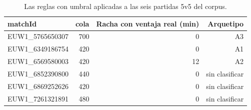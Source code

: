 \begin{table}[H]
\centering
\small
\caption{Las reglas con umbral aplicadas a las seis partidas 5v5 del corpus.}
\label{tab:arquetipos}
\begin{tabular}{lrrr}
\toprule
matchId & cola & Racha con ventaja real (min) & Arquetipo \\
\midrule
EUW1\_5765650307 & 700 & 0 & A3 \\
EUW1\_6349186754 & 420 & 0 & A1 \\
EUW1\_6569580003 & 420 & 12 & A2 \\
EUW1\_6852390800 & 440 & 0 & sin clasificar \\
EUW1\_6869252626 & 420 & 0 & sin clasificar \\
EUW1\_7261321891 & 480 & 0 & sin clasificar \\
\bottomrule
\end{tabular}
\end{table}
